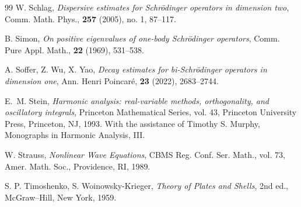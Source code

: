 \documentclass[reqno]{amsart}
\numberwithin{equation}{section}
\begin{document}
\begin{thebibliography}{99}
W. Schlag, \emph{Dispersive estimates for Schr\"odinger operators in dimension two}, Comm. Math.
Phys., \textbf{257} (2005), no. 1, 87--117.

B. Simon, \emph{On positive eigenvalues of one-body Schr\"{o}dinger operators}, Comm. Pure Appl. Math., \textbf{22}
 (1969), 531--538.

 A. Soffer, Z. Wu, X. Yao, \emph{Decay estimates for bi-Schr\"odinger operators in dimension one}, Ann. Henri Poincar\'{e}, \textbf{23} (2022), 2683--2744.

E.~M. Stein, \emph{Harmonic analysis: real-variable methods, orthogonality, and oscillatory integrals}, Princeton Mathematical Series, vol. 43, Princeton University Press, Princeton, NJ, 1993. With the assistance of Timothy S. Murphy, Monographs in Harmonic Analysis, III.

W. Strauss, \emph{Nonlinear Wave Equations}, CBMS Reg. Conf. Ser. Math., vol. 73, Amer. Math. Soc., Providence, RI, 1989.

S. P. Timoshenko, S. Woinowsky-Krieger,
\emph{Theory of Plates and Shells},
2nd ed., McGraw--Hill, New York, 1959.



\end{thebibliography}
\end{document}
